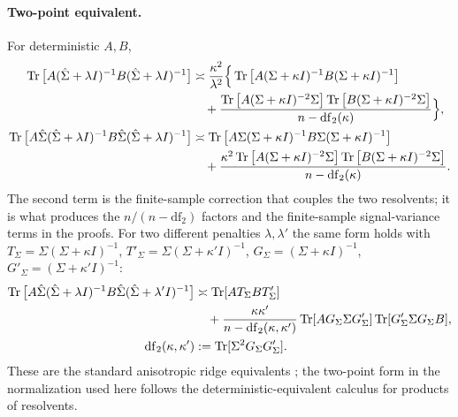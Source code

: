 {\paragraph{Two-point equivalent.}
For deterministic $A,B$,
\begin{align}
\operatorname{Tr}\big[A(\hat\Sigma+\lambda I)^{-1}B(\hat\Sigma+\lambda I)^{-1}\big]
&\asymp\frac{\kappa^2}{\lambda^2}\Big\{
\operatorname{Tr}\big[A(\Sigma+\kappa I)^{-1}B(\Sigma+\kappa I)^{-1}\big]\notag\\
&\quad+\frac{\operatorname{Tr}\big[A(\Sigma+\kappa I)^{-2}\Sigma\big]\operatorname{Tr}\big[B(\Sigma+\kappa I)^{-2}\Sigma\big]}{n-\mathrm{df}_2(\kappa)}
\Big\},
\label{eq:app-two-point-de}\\
\operatorname{Tr}\big[A\hat\Sigma(\hat\Sigma+\lambda I)^{-1}B\hat\Sigma(\hat\Sigma+\lambda I)^{-1}\big]
&\asymp\operatorname{Tr}\big[A\Sigma(\Sigma+\kappa I)^{-1}B\Sigma(\Sigma+\kappa I)^{-1}\big]\notag\\
&\quad+\frac{\kappa^2\operatorname{Tr}\big[A(\Sigma+\kappa I)^{-2}\Sigma\big]\operatorname{Tr}\big[B(\Sigma+\kappa I)^{-2}\Sigma\big]}{n-\mathrm{df}_2(\kappa)} .
\label{eq:app-two-point-de-weighted}
\end{align}
The second term is the finite-sample correction that couples the two
resolvents; it is what produces the $n/(n-\mathrm{df}_2)$ factors and the
finite-sample signal-variance terms in the proofs.  For two different
penalties $\lambda,\lambda'$ the same form holds with
$T_\Sigma=\Sigma(\Sigma+\kappa I)^{-1}$, $T'_\Sigma=\Sigma(\Sigma+\kappa'I)^{-1}$,
$G_\Sigma=(\Sigma+\kappa I)^{-1}$, $G'_\Sigma=(\Sigma+\kappa'I)^{-1}$:
\begin{align}
\operatorname{Tr}\big[A\hat\Sigma(\hat\Sigma+\lambda I)^{-1}B\hat\Sigma(\hat\Sigma+\lambda'I)^{-1}\big]
&\asymp\operatorname{Tr}[AT_\Sigma BT'_\Sigma]\notag\\
&\quad+\frac{\kappa\kappa'}{n-\mathrm{df}_2(\kappa,\kappa')}\operatorname{Tr}[AG_\Sigma\Sigma G'_\Sigma]\operatorname{Tr}[G'_\Sigma\Sigma G_\Sigma B],\\
\qquad
\mathrm{df}_2(\kappa,\kappa')&:=\operatorname{Tr}[\Sigma^2G_\Sigma G'_\Sigma].
\end{align}
These are the standard anisotropic ridge equivalents
\citep{dobriban2018high,hastie2022surprises}; the two-point form in the
normalization used here follows the deterministic-equivalent calculus for
products of resolvents.

}
